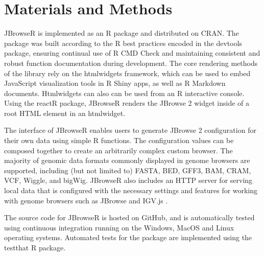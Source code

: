 \documentclass{bioinfo}
\begin{document}
\section{Materials and Methods}

JBrowseR is implemented as an R package and distributed on CRAN. The
package was built according to the R best practices encoded in the
devtools package, ensuring continual use of R CMD Check and maintaining
consistent and robust function documentation during development. The
core rendering methods of the library rely on the htmlwidgets framework,
which can be used to embed JavaScript visualization tools in R Shiny
apps, as well as R Markdown documents. Htmlwidgets can also can be used
from an R interactive console. Using the reactR package, JBrowseR
renders the JBrowse 2 widget inside of a root HTML element in an
htmlwidget.

The interface of JBrowseR enables users to generate JBrowse 2
configuration for their own data using simple R functions. The
configuration values can be composed together to create an arbitrarily
complex custom browser. The majority of genomic data formats commonly
displayed in genome browsers are supported, including (but not limited
to) FASTA, BED, GFF3, BAM, CRAM, VCF, Wiggle, and bigWig. JBrowseR also
includes an HTTP server for serving local data that is configured with
the necessary settings and features for working with genome browsers
such as JBrowse and IGV.js
\citep{robinson2011integrative, robinson2017variant}.

The source code for JBrowseR is hosted on GitHub, and is automatically
tested using continuous integration running on the Windows, MacOS and
Linux operating systems. Automated tests for the package are implemented
using the testthat R package.
\end{document}
